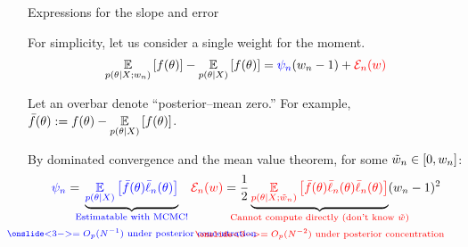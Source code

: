 \begin{frame}[t]{Expressions for the slope and error}


For simplicity, let us consider a single weight for the moment.
%
\begin{align*}
    \underset{p(\theta \vert X; w_n)}{\mathbb{E}}\left[f(\theta)\right] -
        \underset{p(\theta \vert X)}{\mathbb{E}}\left[f(\theta)\right] ={}&
        \textcolor{blue}{\psi_n} (w_n - 1) + \textcolor{red}{\mathcal{E}_n(w)}
\end{align*}

\pause

Let an overbar denote ``posterior--mean zero.''
For example, $\bar{f}(\theta) := f(\theta) - \underset{p(\theta \vert X)}{\mathbb{E}}\left[f(\theta)\right]$.

By dominated convergence and the mean value theorem, for some $\tilde{w}_n \in [0,w_n]$:
%
\begin{align*}
%
\blue{\infl_n} ={}&
\undernote{\blue{
    \expect{\p(\theta \vert \xvec)}{ \thetabar \ellbar_n(\theta)}
}}{\blue{\substack{
    \text{Estimatable with MCMC!} \\
    \text{\,}\\
    \onslide<3->{\text{$= O_p(N^{-1})$ under posterior concentration}}
}}}
&
\red{\err_n(\w)} ={}&
\frac{1}{2}
\undernote{
    \red{\expect{\p(\theta \vert \xvec; \wtil_n)}{
        \thetabar
        \ellbar_n(\theta)
        \ellbar_n(\theta)}}
}
{\red{\substack{
    \text{Cannot compute directly (don't know $\wtil$)} \\ 
    \text{\,}\\
    \onslide<3->{\text{$= O_p(N^{-2})$ under posterior concentration}}
}}}
(\w_n - 1)^2
%
\end{align*}



\end{frame}

